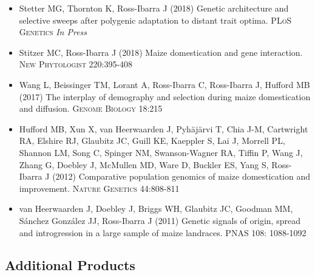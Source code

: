 \documentclass[10pt]{article}
\begin{document}
\begin{itemize} \setlength{\itemsep}{0pt} \setlength{\parskip}{2pt} \setlength{\parsep}{0pt}

  \item {Stetter MG}, Thornton K, { Ross-Ibarra J} (2018) Genetic architecture and selective sweeps after polygenic adaptation to distant trait optima. \textsc{PLoS Genetics} \textit{In Press} %


  \item {Stitzer MC}, {Ross-Ibarra J} (2018) Maize domestication and gene interaction. \textsc{New Phytologist} 220:395-408

  \item Wang L, {Beissinger TM}, {Lorant A}, {Ross-Ibarra C}, {Ross-Ibarra J}, Hufford MB (2017) The interplay of demography and selection during maize domestication and diffusion. \textsc{Genome Biology} 18:215

  \item { Hufford MB}, Xun X, { van Heerwaarden J}, { Pyh\"aj\"arvi T}, Chia J-M, Cartwright RA, Elshire RJ, Glaubitz JC, Guill KE, Kaeppler S, Lai J, Morrell PL, Shannon LM, Song C, Spinger NM, Swanson-Wagner RA, Tiffin P, Wang J, Zhang G, Doebley J, McMullen MD, Ware D, Buckler ES, Yang S, { Ross-Ibarra J} (2012) Comparative population genomics of maize domestication and improvement. \textsc{Nature Genetics} 44:808-811 %

  \item { van Heerwaarden J}, Doebley J, Briggs WH, Glaubitz JC, Goodman MM, S\'{a}nchez Gonz\'{a}lez JJ, { Ross-Ibarra J} (2011) Genetic signals of origin, spread and introgression in a large sample of maize landraces. PNAS 108: 1088-1092

\end{itemize}

\subsection*{Additional Products}
\end{document}

